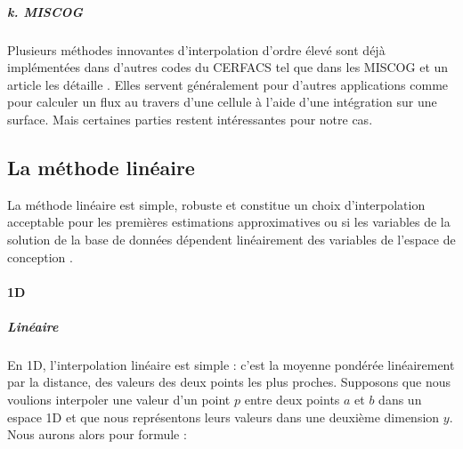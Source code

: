 \subparagraph{k. MISCOG}

\phantom{----}

Plusieurs méthodes innovantes d'interpolation d'ordre élevé sont déjà implémentées dans d'autres codes du CERFACS tel que dans les \ac{MISCOG} et un article les détaille \cite{laborderie2018}. Elles servent généralement pour d'autres applications comme pour calculer un flux au travers d'une cellule \cite{alexis} à l'aide d'une intégration sur une surface. Mais certaines parties restent intéressantes pour notre cas.


\newpage


\subsection{La méthode linéaire}
La méthode linéaire est simple, robuste et constitue un choix d'interpolation acceptable pour les premières estimations approximatives ou si les variables de la solution de la base de données dépendent linéairement des variables de l'espace de conception \cite{palmer2009}.


\paragraph{1D}
\vspace{-0.5cm}
\subparagraph{Linéaire}
En 1D, l'interpolation linéaire est simple \cite{fluidssengineer, palmer2009}: c'est la moyenne pondérée linéairement par la distance, des valeurs des deux points les plus proches.
Supposons que nous voulions interpoler une valeur d'un point \( p \) entre deux points \( a \) et \( b \) dans un espace 1D
et que nous représentons leurs valeurs dans une deuxième dimension \( y \).
Nous aurons alors pour formule :

